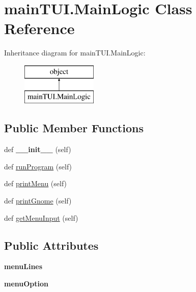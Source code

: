 \hypertarget{classmain_t_u_i_1_1_main_logic}{}\section{main\+T\+U\+I.\+Main\+Logic Class Reference}
\label{classmain_t_u_i_1_1_main_logic}
Inheritance diagram for main\+T\+U\+I.\+Main\+Logic\+:\begin{figure}[H]
\begin{center}
\leavevmode
\includegraphics[height=2.000000cm]{classmain_t_u_i_1_1_main_logic}
\end{center}
\end{figure}
\subsection*{Public Member Functions}
\begin{DoxyCompactItemize}
\item 
\hypertarget{classmain_t_u_i_1_1_main_logic_a56aeaabebe5a505379f188d266258979}{}\label{classmain_t_u_i_1_1_main_logic_a56aeaabebe5a505379f188d266258979} 
def {\bfseries \+\_\+\+\_\+init\+\_\+\+\_\+} (self)
\item 
def \hyperlink{classmain_t_u_i_1_1_main_logic_a174991d65104326c736a0d8e3c3e8edd}{run\+Program} (self)
\item 
def \hyperlink{classmain_t_u_i_1_1_main_logic_a0850095d67fa526a848768588eb06ea6}{print\+Menu} (self)
\item 
def \hyperlink{classmain_t_u_i_1_1_main_logic_a91c2a1b004ea6a497dd81ed41528c650}{print\+Gnome} (self)
\item 
def \hyperlink{classmain_t_u_i_1_1_main_logic_ab5d87725a59118bc0816a8a1dd21f06f}{get\+Menu\+Input} (self)
\end{DoxyCompactItemize}
\subsection*{Public Attributes}
\begin{DoxyCompactItemize}
\item 
\hypertarget{classmain_t_u_i_1_1_main_logic_af22c744bd91e1f06fe254936f45ea4b2}{}\label{classmain_t_u_i_1_1_main_logic_af22c744bd91e1f06fe254936f45ea4b2} 
{\bfseries menu\+Lines}
\item 
\hypertarget{classmain_t_u_i_1_1_main_logic_a4cbf963e6d6b4e98fd8eec7c131f3976}{}\label{classmain_t_u_i_1_1_main_logic_a4cbf963e6d6b4e98fd8eec7c131f3976} 
{\bfseries menu\+Option}
\end{DoxyCompactItemize}


